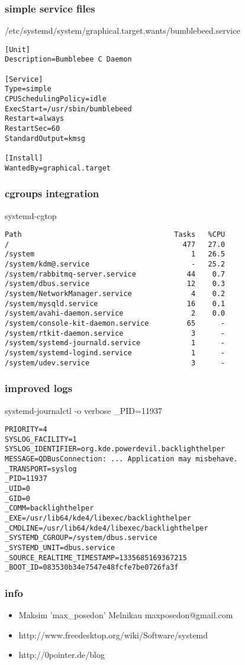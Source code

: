 \documentclass{beamer}
\begin{document}
\begin{frame}[fragile]
    \frametitle{simple service files}
    \begin{block}{/etc/systemd/system/graphical.target.wants/bumblebeed.service}
        \begin{verbatim}
[Unit]
Description=Bumblebee C Daemon

[Service]
Type=simple
CPUSchedulingPolicy=idle
ExecStart=/usr/sbin/bumblebeed
Restart=always
RestartSec=60
StandardOutput=kmsg

[Install]
WantedBy=graphical.target
        \end{verbatim}
    \end{block}

\end{frame}

\begin{frame}[fragile]
    \frametitle{cgroups integration}
    \begin{block}{systemd-cgtop}
        \begin{verbatim}
Path                                    Tasks   %CPU
/                                         477   27.0
/system                                     1   26.5
/system/kdm@.service                        -   25.2
/system/rabbitmq-server.service            44    0.7
/system/dbus.service                       12    0.3
/system/NetworkManager.service              4    0.2
/system/mysqld.service                     16    0.1
/system/avahi-daemon.service                2    0.0
/system/console-kit-daemon.service         65      -
/system/rtkit-daemon.service                3      -
/system/systemd-journald.service            1      -
/system/systemd-logind.service              1      -
/system/udev.service                        3      -
        \end{verbatim}
    \end{block}
\end{frame}

\begin{frame}[fragile]
    \frametitle{improved logs}
    \begin{block}{systemd-journalctl -o verbose \_PID=11937}
        \begin{verbatim}
PRIORITY=4
SYSLOG_FACILITY=1
SYSLOG_IDENTIFIER=org.kde.powerdevil.backlighthelper
MESSAGE=QDBusConnection: ... Application may misbehave.
_TRANSPORT=syslog
_PID=11937
_UID=0
_GID=0
_COMM=backlighthelper
_EXE=/usr/lib64/kde4/libexec/backlighthelper
_CMDLINE=/usr/lib64/kde4/libexec/backlighthelper
_SYSTEMD_CGROUP=/system/dbus.service
_SYSTEMD_UNIT=dbus.service
_SOURCE_REALTIME_TIMESTAMP=1335685169367215
_BOOT_ID=083530b34e7547e48fcfe7be0726fa3f
        \end{verbatim}
    \end{block}
\end{frame}

\begin{frame}[fragile]
    \frametitle{info}
    \begin{itemize}
    \item Maksim 'max\_posedon' Melnikau maxposedon@gmail.com
    \item http://www.freedesktop.org/wiki/Software/systemd
    \item http://0pointer.de/blog
    \end{itemize}
\end{frame}
\end{document}
